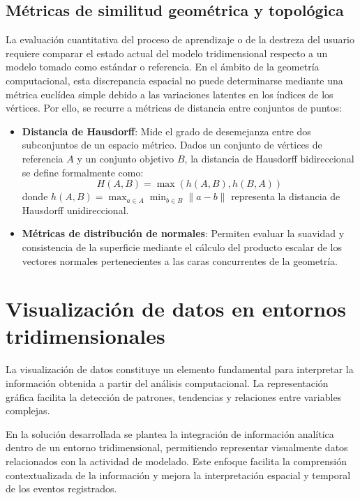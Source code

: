 \subsection{Métricas de similitud geométrica y topológica}

La evaluación cuantitativa del proceso de aprendizaje o de la destreza del usuario requiere comparar el estado actual del modelo tridimensional respecto a un modelo tomado como estándar o referencia. En el ámbito de la geometría computacional, esta discrepancia espacial no puede determinarse mediante una métrica euclídea simple debido a las variaciones latentes en los índices de los vértices. Por ello, se recurre a métricas de distancia entre conjuntos de puntos:

\begin{itemize}
    \item \textbf{Distancia de Hausdorff}: Mide el grado de desemejanza entre dos subconjuntos de un espacio métrico. Dados un conjunto de vértices de referencia $A$ y un conjunto objetivo $B$, la distancia de Hausdorff bidireccional se define formalmente como:
    $$H(A, B) = \max(h(A, B), h(B, A))$$
    donde $h(A, B) = \max_{a \in A} \min_{b \in B} \lVert a - b \rVert$ representa la distancia de Hausdorff unidireccional.
    \item \textbf{Métricas de distribución de normales}: Permiten evaluar la suavidad y consistencia de la superficie mediante el cálculo del producto escalar de los vectores normales pertenecientes a las caras concurrentes de la geometría.
\end{itemize}

\section{Visualización de datos en entornos tridimensionales}

La visualización de datos constituye un elemento fundamental para interpretar la información obtenida a partir del análisis computacional. La representación gráfica facilita la detección de patrones, tendencias y relaciones entre variables complejas.

En la solución desarrollada se plantea la integración de información analítica dentro de un entorno tridimensional, permitiendo representar visualmente datos relacionados con la actividad de modelado. Este enfoque facilita la comprensión contextualizada de la información y mejora la interpretación espacial y temporal de los eventos registrados.

